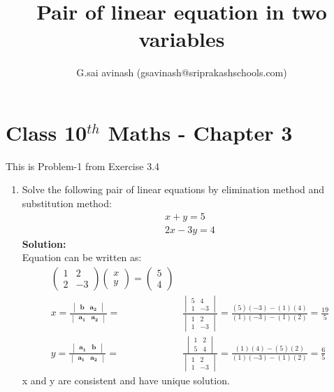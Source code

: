 \documentclass[12pt]{article}
\title{Pair of linear equation in two variables}
\author{G.sai avinash (gsavinash@sriprakashschools.com)}
\newcommand{\myvec}[1]{\ensuremath{\begin{pmatrix}#1\end{pmatrix}}}
\newcommand{\mydet}[1]{\ensuremath{\begin{vmatrix}#1\end{vmatrix}}}
\newcommand{\solution}{\noindent \textbf{Solution: }}
\let\vec\mathbf
\begin{document}
\maketitle
\section*{Class 10$^{th}$ Maths - Chapter 3}
This is Problem-1 from Exercise 3.4
\begin{enumerate}
\item   Solve the following pair of linear equations by elimination method and substitution method:                         
\begin{align}
    x+y=5\\
        2x-3y=4
\end{align}
\solution\\
Equation can be written as:\\
\begin{align}
\myvec{1&2\\ 2&-3}\myvec{x\\y} = \myvec{5\\4}\\
x=\frac{{\mydet{ \vec{b} & \vec{a_2}}}}{\mydet{\vec{a_1} & 
\vec{a_2}}}=&\frac{\mydet{5 & 4 \\ 1 & -3}}{\mydet{1 &2 \\ 1 & -3}}=
\frac{(5)(-3) - (1)(4)}{(1)(-3) - (1)(2)}=
\frac{19}{5}\\
y=\frac{{\mydet{ \vec{a_1} & \vec{b}}}}{\mydet{\vec{a_1} & 
\vec{a_2}}}=&\frac{\mydet{1 & 2 \\ 5 & 4}}{\mydet{1 &2 \\ 1 & -3}}=
\frac{(1)(4) - (5)(2)}{(1)(-3) - (1)(2)}=
\frac{6}{5}
\end{align}
 x and y are consistent and have unique solution.










\end{enumerate}
\end{document}
